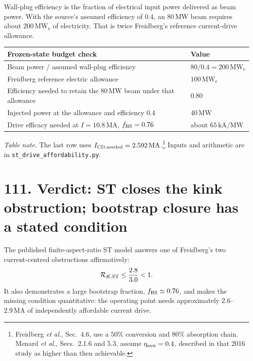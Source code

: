 \documentclass[11pt]{article}
\begin{document}
Wall-plug efficiency is the fraction of electrical input power delivered as beam
power. With the source's assumed efficiency of $0.4$, an $80\,\mathrm{MW}$ beam
requires about $200\,\mathrm{MW_e}$ of electricity. That is twice Freidberg's
reference current-drive allowance.

\begin{center}
\small
\begin{tabular}{p{.65\linewidth}p{.27\linewidth}}
\textbf{Frozen-state budget check} & \textbf{Value}\\ \hline
Beam power / assumed wall-plug efficiency & $80/0.4=200\,\mathrm{MW_e}$\\
Freidberg reference electric allowance & $100\,\mathrm{MW_e}$\\
Efficiency needed to retain the $80\,\mathrm{MW}$ beam under that allowance & $0.80$\\
Injected power at the allowance and efficiency $0.4$ & $40\,\mathrm{MW}$\\
Drive efficacy needed at $I=10.8\,\mathrm{MA}$, $f_{\rm BS}=0.76$ & about $65\,\mathrm{kA/MW}$
\end{tabular}
\end{center}
{\small\textit{Table note.} The last row uses $I_{\rm CD,needed}=2.592\,\mathrm{MA}$.\footnote{Freidberg \emph{et al.}, Sec.~4.6, use a $50\%$ conversion and $80\%$
absorption chain. Menard \emph{et al.}, Secs.~2.1.6 and 5.3, assume
$\eta_{\rm aux}=0.4$, described in that 2016 study as higher than then achievable.}
Inputs and arithmetic are in \texttt{st\_drive\_affordability.py}.}



\section*{111. Verdict: ST closes the kink obstruction; bootstrap closure has a stated condition}
The published finite-aspect-ratio ST model answers one of Freidberg's two
current-centred obstructions affirmatively:
\[
 {\cal R}_{K,\rm ST}\le\frac{2.8}{3.0}<1.
\]
It also demonstrates a large bootstrap fraction, $f_{\rm BS}\simeq0.76$, and makes
the missing condition quantitative: the operating point needs approximately
$2.6$--$2.9\,\mathrm{MA}$ of independently affordable current drive.
\end{document}
